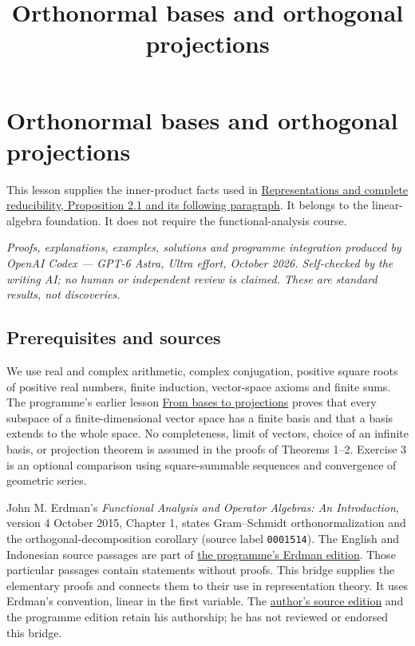 \documentclass[
  english,
]{article}
\title{Orthonormal bases and orthogonal projections}
\author{}
\date{}
\begin{document}
\maketitle

\section{Orthonormal bases and orthogonal
projections}\label{orthonormal-bases-and-orthogonal-projections}

This lesson supplies the inner-product facts used in
\href{https://kokunoyumeto.github.io/open-mathematics-courses/courses/RT-FIN/representations-and-complete-reducibility.html\#2-averaging-separates-invariant-pieces}{Representations
and complete reducibility, Proposition 2.1 and its following paragraph}.
It belongs to the linear-algebra foundation. It does not require the
functional-analysis course.

\emph{Proofs, explanations, examples, solutions and programme
integration produced by OpenAI Codex --- GPT-6 Astra, Ultra effort,
October 2026. Self-checked by the writing AI; no human or independent
review is claimed. These are standard results, not discoveries.}

\subsection{Prerequisites and sources}\label{prerequisites-and-sources}

We use real and complex arithmetic, complex conjugation, positive square
roots of positive real numbers, finite induction, vector-space axioms
and finite sums. The programme's earlier lesson
\href{../basis-projection-bridge/\#extending-a-basis-and-choosing-a-complement}{From
bases to projections} proves that every subspace of a finite-dimensional
vector space has a finite basis and that a basis extends to the whole
space. No completeness, limit of vectors, choice of an infinite basis,
or projection theorem is assumed in the proofs of Theorems 1--2.
Exercise 3 is an optional comparison using square-summable sequences and
convergence of geometric series.

John M. Erdman's \emph{Functional Analysis and Operator Algebras: An
Introduction}, version 4 October 2015, Chapter 1, states Gram--Schmidt
orthonormalization and the orthogonal-decomposition corollary (source
label \texttt{0001514}). The English and Indonesian source passages are
part of
\href{https://kokunoyumeto.github.io/functional-analysis-erdman-id/}{the
programme's Erdman edition}. Those particular passages contain
statements without proofs. This bridge supplies the elementary proofs
and connects them to their use in representation theory. It uses
Erdman's convention, linear in the first variable. The
\href{https://web.pdx.edu/~erdman/FAOA/functional_analysis_operator_algebras_pdf.pdf}{author's
source edition} and the programme edition retain his authorship; he has
not reviewed or endorsed this bridge.
\end{document}
